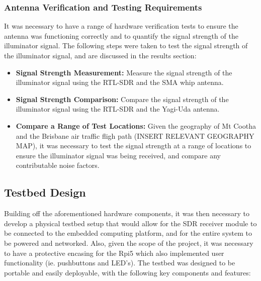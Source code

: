 \subsubsection{Antenna Verification and Testing Requirements}
It was necessary to have a range of hardware verification tests to ensure the antenna was functioning correctly and to quantify the signal strength of the illuminator signal. The following steps were taken to test the signal strength of the illuminator signal, and are discussed in the results section:
\begin{itemize}
    \item \textbf{Signal Strength Measurement:} Measure the signal strength of the illuminator signal using the RTL-SDR and the SMA whip antenna.
    \item \textbf{Signal Strength Comparison:} Compare the signal strength of the illuminator signal using the RTL-SDR and the Yagi-Uda antenna.
    \item \textbf{Compare a Range of Test Locations:} Given the geography of Mt Cootha and the Brisbane air traffic fligh path (INSERT RELEVANT GEOGRAPHY MAP), it was necessary to test the signal strength at a range of locations to ensure the illuminator signal was being received, and compare any contributable noise factors.
\end{itemize}


\subsection{Testbed Design \label{sec:testbed}}
Building off the aforementioned hardware components, it was then necessary to develop a physical testbed setup that would allow for the SDR receiver module to be connected to the embedded computing platform, and for the entire system to be powered and networked. Also, given the scope of the project, it was necessary to have a protective encasing for the Rpi5 which also implemented user functionality (ie. pushbuttons and LED's). The testbed was designed to be portable and easily deployable, with the following key components and features:

